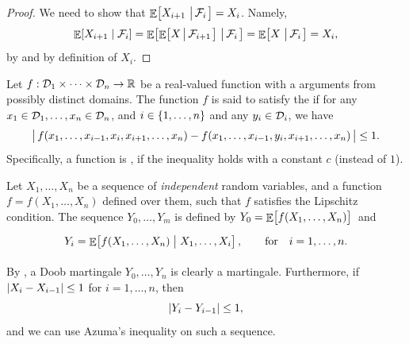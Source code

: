 \begin{proof}
    We need to show that $\mathop{\mathbb{E}}\!\left[ {X_{i+1} \,\left|\, { \mathcal{F}_i } \bigr.\right.} \right] =
    X_i$. Namely,
    \begin{align*}
      \ExCond{X_{i+1} }{ \Family_i }%
      =%
      \Ex{ \Ex{ X \sepw{\bigl. \Family_{i+1}}} \sep{ \Family_i}}%
      =%
      \Ex{ X \sep{ \Family_i}}%
      =%
      X_i,
    \end{align*}
    by  and by definition of $X_i$.
\end{proof}

\begin{defn}
    Let $f:\mathcal{D}_1 \times \cdots \times \mathcal{D}_n \rightarrow \mathbb{R}$
    be a real-valued function with a arguments from possibly distinct
    domains. The function $f$ is said to satisfy the  if for any
    $x_1 \in \mathcal{D}_1, \ldots, x_n \in \mathcal{D}_n$, and
    $i \in \left\{ {1,\ldots,n} \right\}$ and any $y_i \in \mathcal{D}_i$, we have
    \begin{equation*}
        \cardin{\big.\, f(x_1,\ldots, x_{i-1}, x_i, x_{i+1}, \ldots,
           x_n) - f (x_1, \ldots, x_{i-1}, y_i, x_{i+1},\ldots, x_n)%
           \, } \leq 1.
    \end{equation*}
    Specifically, a function is , if the
    inequality holds with a constant $c$ (instead of $1$).
\end{defn}

\begin{defn}
    Let $X_1, \ldots, X_n$ be a sequence of \emph{independent} random
    variables, and a function $f = f( X_1,\ldots, X_n )$ defined over
    them, such that $f$ satisfies the Lipschitz condition. The
     sequence $Y_0, \ldots, Y_m$ is defined by
    $Y_0 = \mathop{\mathbb{E}}\!\left[ {\bigl. f(X_1, \ldots, X_n)} \right]\,$ and
    \begin{equation*}
        \Bigl.  Y_i = \mathop{\mathbb{E}}\!\left[ f(X_1,\ldots, X_n)  \;\middle\vert\; \bigl. X_1, \ldots,
           X_i \right],
        \qquad\text{for}\quad i=1,\ldots, n.
    \end{equation*}
\end{defn}

By , a Doob martingale $Y_0, \ldots, Y_n$ is
clearly a martingale.
Furthermore, if $\left| {X_i - X_{i-1}} \right| \leq 1$
for $i=1,\ldots, n$, then
\[
\left| {Y_i - Y_{i-1}} \right| \leq 1,
\]
and we can
use Azuma's inequality on such a sequence.




